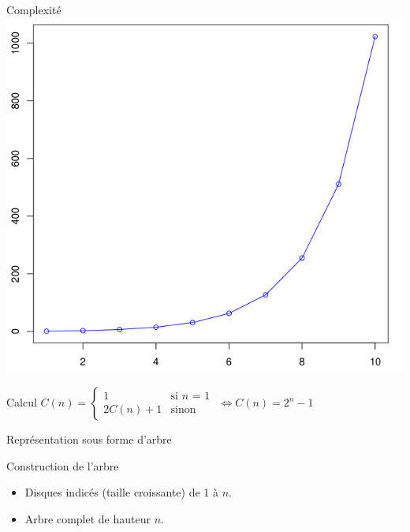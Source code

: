 \documentclass[usenames,dvipsnames,serif,14pt]{beamer}%
\begin{document}
\begin{frame}{Complexité}
  \centering
  \includegraphics[scale=0.2]{R_curve.png}
  \begin{block}{Calcul}
    $C(n) =
    \begin{cases}
      1 & \mbox{si $n$ = 1}\\
      2C(n)+1 & \mbox{sinon}
    \end{cases}
    $
    $\Leftrightarrow \boxed{C(n) = 2^{n}-1}$
  \end{block}
\end{frame}


\begin{frame}{Représentation sous forme d'arbre}
  \begin{block}{Construction de l'arbre}
  \begin{center}
  \end{center}
  \begin{itemize}
    \justifying
    \item Disques indicés (taille croissante) de 1 à $n$.
    \item Arbre complet de hauteur $n$.
  \end{itemize}
  \end{block}
\end{frame}
\end{document}
